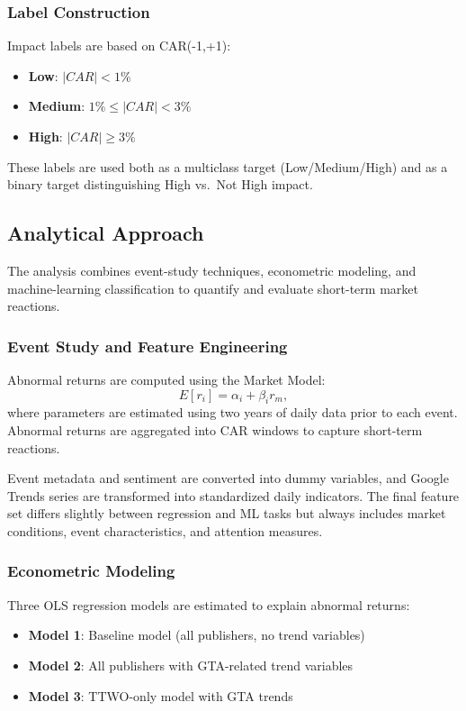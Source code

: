 \documentclass[11pt,a4paper]{article}
\begin{document}
\subsubsection{Label Construction}

Impact labels are based on CAR(-1,+1):
\begin{itemize}[topsep=2pt]
    \item \textbf{Low}: $|CAR| < 1\%$
    \item \textbf{Medium}: $1\% \le |CAR| < 3\%$
    \item \textbf{High}: $|CAR| \ge 3\%$
\end{itemize}

These labels are used both as a multiclass target (Low/Medium/High) and as a binary target distinguishing High vs.\ Not High impact.

\subsection{Analytical Approach}

The analysis combines event-study techniques, econometric modeling, and machine-learning classification to quantify and evaluate short-term market reactions.

\subsubsection{Event Study and Feature Engineering}

Abnormal returns are computed using the Market Model:
\[
E[r_i] = \alpha_i + \beta_i r_m,
\]
where parameters are estimated using two years of daily data prior to each event. Abnormal returns are aggregated into CAR windows to capture short-term reactions.

Event metadata and sentiment are converted into dummy variables, and Google Trends series are transformed into standardized daily indicators. The final feature set differs slightly between regression and ML tasks but always includes market conditions, event characteristics, and attention measures.

\subsubsection{Econometric Modeling}

Three OLS regression models are estimated to explain abnormal returns:
\begin{itemize}[topsep=2pt]
    \item \textbf{Model 1}: Baseline model (all publishers, no trend variables)
    \item \textbf{Model 2}: All publishers with GTA-related trend variables
    \item \textbf{Model 3}: TTWO-only model with GTA trends
\end{itemize}
\end{document}
